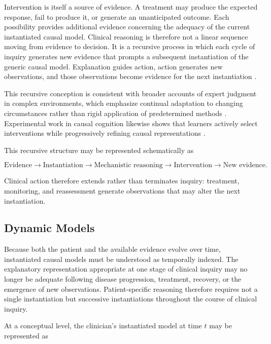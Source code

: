 \documentclass[11pt]{article}
\begin{document}
Intervention is itself a source of evidence. A treatment may produce the expected response, fail to produce it, or generate an unanticipated outcome. Each possibility provides additional evidence concerning the adequacy of the current instantiated causal model. Clinical reasoning is therefore not a linear sequence moving from evidence to decision. It is a recursive process in which each cycle of inquiry generates new evidence that prompts a subsequent instantiation of the generic causal model. Explanation guides action, action generates new observations, and those observations become evidence for the next instantiation \parencite{collins_dynamic_2014,collins_synthesis_2018}.

This recursive conception is consistent with broader accounts of expert judgment in complex environments, which emphasize continual adaptation to changing circumstances rather than rigid application of predetermined methods \parencite{collins_it_2022}. Experimental work in causal cognition likewise shows that learners actively select interventions while progressively refining causal representations \parencite{gong_active_2023}.

This recursive structure may be represented schematically as

\[
\text{Evidence}
\rightarrow
\text{Instantiation}
\rightarrow
\text{Mechanistic reasoning}
\rightarrow
\text{Intervention}
\rightarrow
\text{New evidence}.
\]

Clinical action therefore extends rather than terminates inquiry: treatment, monitoring, and reassessment generate observations that may alter the next instantiation.

\subsection{Dynamic Models}

Because both the patient and the available evidence evolve over time, instantiated causal models must be understood as temporally indexed. The explanatory representation appropriate at one stage of clinical inquiry may no longer be adequate following disease progression, treatment, recovery, or the emergence of new observations. Patient-specific reasoning therefore requires not a single instantiation but successive instantiations throughout the course of clinical inquiry.

At a conceptual level, the clinician's instantiated model at time $t$ may be represented as
\end{document}
